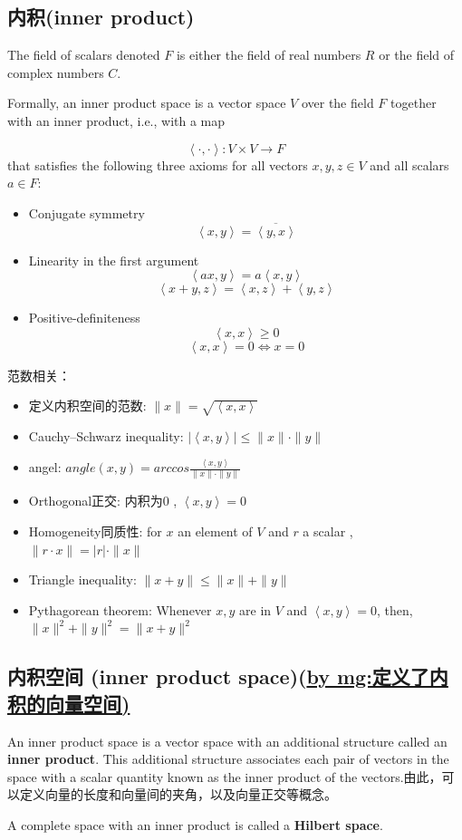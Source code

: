 \subsection{内积(inner product)}
\cite{inner product space}
The field of scalars denoted $F$ is either the field of real numbers $R$ or the field of complex numbers $C$.\par
Formally, an inner product space is a vector space $V$ over the field $F$ together with an inner product, i.e., with a map\par
\[\left< \cdot,\cdot \right> : V \times V \rightarrow F\]
that satisfies the following three axioms for all vectors $x , y , z \in V$ and all scalars $a \in F$:\par
\begin{itemize}
\item {Conjugate symmetry}
\[ \left< x,y \right> = \overline{\left< y,x \right>} \]
\item{Linearity in the first argument}
\[ \left< ax,y \right> = a \left< x,y \right> \]
\[ \left< x+y,z \right>= \left< x,z \right> + \left< y,z \right> \]
\item{Positive-definiteness}
\[ \left< x,x \right> \geq 0 \]
\[ \left< x,x \right> = 0 \Leftrightarrow x=0 \]
\end{itemize}

范数相关：\par
\begin{itemize}
\item {定义内积空间的范数}: $\|x\|=\sqrt{\left< x,x \right>}$
\item {Cauchy–Schwarz inequality}: $|\left< x,y \right>| \leq \|x\| \cdot \|y\|$
\item {angel}: $angle(x,y)=arccos \frac{\left< x,y \right>}{\|x\| \cdot \|y\|}$
\item {Orthogonal正交}: 内积为0 , $ \left< x,y \right>=0$
\item {Homogeneity同质性}: for $x$ an element of $V$ and $r$ a scalar , $\|r \cdot x\| = |r| \cdot \|x\|$
\item {Triangle inequality}: $ \|x+y\| \leq \|x\| + \|y\|$
\item {Pythagorean theorem}: Whenever $x,y$ are in $V$ and \underline{$\left< x,y \right>=0$}, then, $\|x\|^2 + \|y\|^2 = \|x+y\|^2$
\end{itemize}


\subsection{内积空间 (inner product space)(\underline{by mg:定义了内积的向量空间)}}
\cite{inner product space}
An inner product space is a vector space with an additional structure called an \textbf{inner product}. This additional structure associates each pair of vectors in the space with a scalar quantity known as the inner product of the vectors.由此，可以定义向量的长度和向量间的夹角，以及向量正交等概念。\par
A complete space with an inner product is called a \textbf{Hilbert space}.

